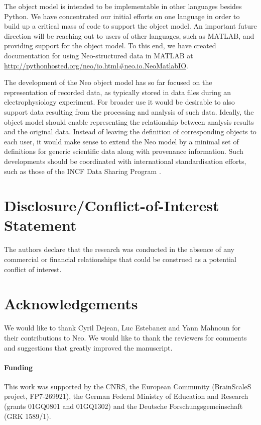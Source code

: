 \documentclass{frontiers}
\begin{document}
The object model is intended to be implementable in other languages besides Python.
We have concentrated our initial efforts on one language in order to build up a critical mass of code to support the object model.
An important future direction will be reaching out to users of other languages, such as MATLAB, and providing support for the object model.
To this end, we have created documentation for using Neo-structured data in MATLAB at \url{http://pythonhosted.org/neo/io.html#neo.io.NeoMatlabIO}.

The development of the Neo object model has so far focused on the representation of recorded data, as typically stored in data files during an electrophysiology experiment.
For broader use it would be desirable to also support data resulting from the processing and analysis of such data.
Ideally, the object model should enable representing the relationship between analysis results and the original data.
Instead of leaving the definition of corresponding objects to each user, it would make sense to extend the Neo model by a minimal set of definitions for generic scientific data along with provenance information.
Such developments should be coordinated with international standardisation efforts, such as those of the INCF Data Sharing Program \citep{Teeters2013}.

\section*{Disclosure/Conflict-of-Interest Statement}
The authors declare that the research was conducted in the absence of any commercial or financial relationships that could be construed as a potential conflict of interest.

\section*{Acknowledgements}
We would like to thank Cyril Dejean, Luc Estebanez and Yann Mahnoun for their contributions to Neo. We would like to thank the reviewers for comments and suggestions that greatly improved the manuscript.

\paragraph{Funding\textcolon} This work was supported by the CNRS, the European Community (BrainScaleS project, FP7-269921), the German Federal Ministry of Education and Research (grants 01GQ0801 and 01GQ1302) and the Deutsche Forschungsgemeinschaft (GRK 1589/1).


\end{document}
